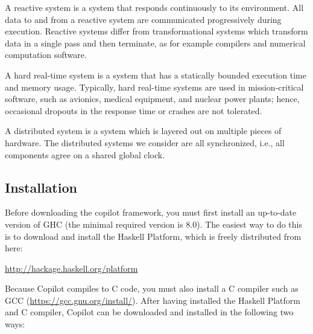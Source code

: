 A reactive system is a system that responds continuously to its environment.
All data to and from a reactive system are communicated progressively during
execution. Reactive systems differ from transformational systems which transform
data in a single pass and then terminate, as for example compilers and numerical
computation software.

A hard real-time system is a system that has a statically bounded execution time
and memory usage.  Typically, hard real-time systems are used in
mission-critical software, such as avionics, medical equipment, and nuclear power
plants; hence, occasional dropouts in the response time or crashes are not
tolerated.

A distributed system is a system which is layered out on multiple pieces of hardware.
The distributed systems we consider are all synchronized, i.e., all components agree on
a shared global clock.


\subsection{Installation} \label{sec:install}

Before downloading the copilot framework, you must first install an
up-to-date version of GHC (the minimal required version is 8.0).
The easiest way to do this is to download and install the Haskell Platform,
which is freely distributed from here:

\begin{center}
\url{http://hackage.haskell.org/platform}
\end{center}

\noindent Because Copilot compiles to C code, you must also install a C compiler such as GCC (\url{https://gcc.gnu.org/install/}). After having installed the Haskell Platform and C compiler, Copilot can be downloaded and
installed in the following two ways:

